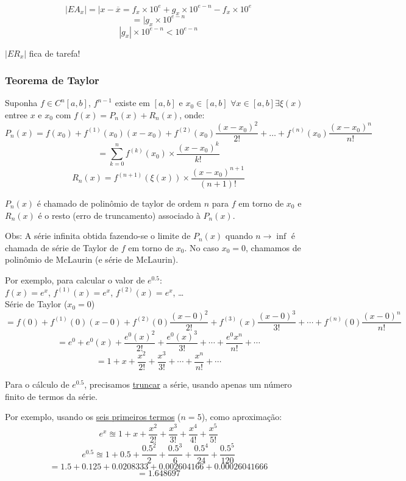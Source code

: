 \documentclass[a4paper,oneside,article,table]{article}
\begin{document}
    \[|EA_x| = |x - \overline{x} = f_x \times 10^e + g_x \times 10^{e-n} - f_x \times 10^e\]
    \[= |g_x \times 10^{e-n}\]
    \[|g_x| \times 10^{e-n} < 10^{e-n}\]


    $|ER_x|$ fica de tarefa!


    \subsubsection{Teorema de Taylor}
    Suponha $f \in C^n[a,b]$, $f^{n-1}$ existe em $[a,b]$ e $x_0 \in [a,b]$
    $\forall x \in [a,b] \exists \xi(x)$ entree $x$ e $x_0$ com
    $f(x) = P_n(x) + R_n(x)$, onde:
    \[P_n(x) = f(x_0) + f^{(1)}(x_0)(x - x_0) + f^{(2)}(x_0)\frac{(x-x_0)^2}{2!} + \ldots + f^{(n)}(x_0)\frac{(x-x_0)^n}{n!}\]
    \[= \sum_{k=0}^{n} f^{(k)}(x_0) \times \frac{{(x - x_0)}^k}{k!}\]
    \[R_n(x) = f^{(n+1)}(\xi(x)) \times \frac{{(x - x_0)}^{n+1}}{(n + 1)!}\]


        $P_n(x)$ é chamado de polinômio de taylor de ordem $n$ para $f$ em torno de $x_0$ e $R_n(x)$ é o resto (erro de truncamento) associado à $P_n(x)$.

        Obs: A série infinita obtida fazendo-se o limite de $P_n(x)$ quando $n \rightarrow \inf$ é chamada de série de Taylor de $f$ em torno de $x_0$. No caso $x_0 = 0$, chamamos de polinômio de McLaurin (e série de McLaurin).

        Por exemplo, para calcular o valor de $e^{0.5}$:\\
        $f(x) = e^x$, $f^{(1)}(x) = e^x$, $f^{(2)}(x) = e^x$, \ldots~\\

        Série de Taylor ($x_0 = 0$)
        \[= f(0) + f^{(1)}(0)(x - 0) + f^{(2)}(0)\frac{(x - 0)^2}{2!} + f^{(3)}(x)\frac{(x - 0)^3}{3!} + \cdots + f^{(n)}(0)\frac{(x-0)^n}{n!}\]
        \[= e^0 + e^0(x) + \frac{e^0(x)^2}{2!} + \frac{e^0(x)^3}{3!} + \cdots + \frac{e^0x^n}{n!} + \cdots\]
        \[= 1 + x + \frac{x^2}{2!} + \frac{x^3}{3!} + \cdots + \frac{x^n}{n!} + \cdots\]

        Para o cálculo de $e^{0.5}$, precisamos \underline{truncar} a série, usando apenas um número finito de termos da série.

        Por exemplo, usando os \underline{seis primeiros termos} ($n = 5$), como aproximação:
        \[e^x \approxeq 1 + x + \frac{x^2}{2!} + \frac{x^3}{3!} + \frac{x^4}{4!} + \frac{x^5}{5!}\]
        \[e^{0.5} \approxeq 1 + 0.5 + \frac{0.5^2}{2} + \frac{0.5^3}{6} + \frac{0.5^4}{24} + \frac{0.5^5}{120}\]
        \[= 1.5 + 0.125 + 0.0208333 + 0.002604166 + 0.00026041666\]
        \[= 1.648697\]
\end{document}
